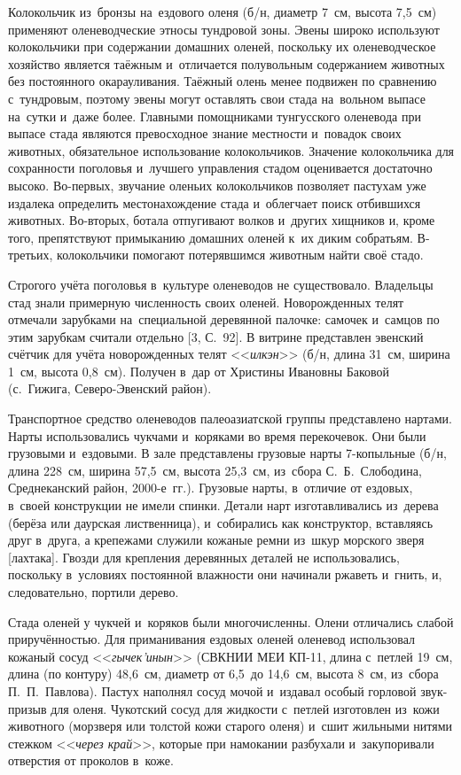 Колокольчик из~бронзы на~ездового оленя (б/н, диаметр 7~см, высота 7,5~см) применяют оленеводческие этносы тундровой зоны. Эвены широко используют колокольчики при содержании домашних оленей, поскольку их оленеводческое хозяйство является таёжным и~отличается полувольным содержанием животных без постоянного окарауливания. Таёжный олень менее подвижен по сравнению с~тундровым, поэтому эвены могут оставлять свои стада на~вольном выпасе на~сутки и~даже более. Главными помощниками тунгусского оленевода при выпасе стада являются превосходное знание местности и~повадок своих животных, обязательное использование колокольчиков. Значение колокольчика для сохранности поголовья и~лучшего управления стадом оценивается достаточно высоко. Во-первых, звучание оленьих колокольчиков позволяет пастухам уже издалека определить местонахождение стада и~облегчает поиск отбившихся животных. Во-вторых, ботала отпугивают волков и~других хищников и, кроме того, препятствуют примыканию домашних оленей к~их диким собратьям. В-третьих, колокольчики помогают потерявшимся животным найти своё стадо.

Строгого учёта поголовья в~культуре оленеводов не существовало. Владельцы стад знали примерную численность своих оленей. Новорожденных телят отмечали зарубками на~специальной деревянной палочке: самочек и~самцов по этим зарубкам считали отдельно [3, С.~92]. В витрине представлен эвенский счётчик для учёта новорожденных телят <<\textit{илкэн}>> (б/н, длина 31~см, ширина 1~см, высота 0,8~см). Получен в~дар от Христины Ивановны Баковой (с.~Гижига, Северо-Эвенский район).

Транспортное средство оленеводов палеоазиатской группы представлено нартами. Нарты использовались чукчами и~коряками во время перекочевок. Они были грузовыми и~ездовыми. В зале представлены грузовые нарты 7-копыльные (б/н, длина 228~см, ширина 57,5~см, высота 25,3~см, из~сбора С.~Б.~Слободина, Среднеканский район, 2000-е~гг.). Грузовые нарты, в~отличие от ездовых, в~своей конструкции не имели спинки. Детали нарт изготавливались из~дерева (берёза или даурская лиственница), и~собирались как конструктор, вставляясь друг в~друга, а крепежами служили кожаные ремни из~шкур морского зверя [лахтака]. Гвозди для крепления деревянных деталей не использовались, поскольку в~условиях постоянной влажности они начинали ржаветь и~гнить, и, следовательно, портили дерево.

Стада оленей у чукчей и~коряков были многочисленны. Олени отличались слабой приручённостью. Для приманивания ездовых оленей оленевод использовал кожаный сосуд <<\textit{гычек'инын}>> (СВКНИИ МЕИ КП-11, длина с~петлей 19~см, длина (по контуру) 48,6~см, диаметр от 6,5~до 14,6~см, высота 8~см, из~сбора П.~П.~Павлова). Пастух наполнял сосуд мочой и~издавал особый горловой звук-призыв для оленя. Чукотский сосуд для жидкости с~петлей изготовлен из~кожи животного (морзверя или толстой кожи старого оленя) и~сшит жильными нитями стежком <<\textit{через край}>>, которые при намокании разбухали и~закупоривали отверстия от проколов в~коже.

